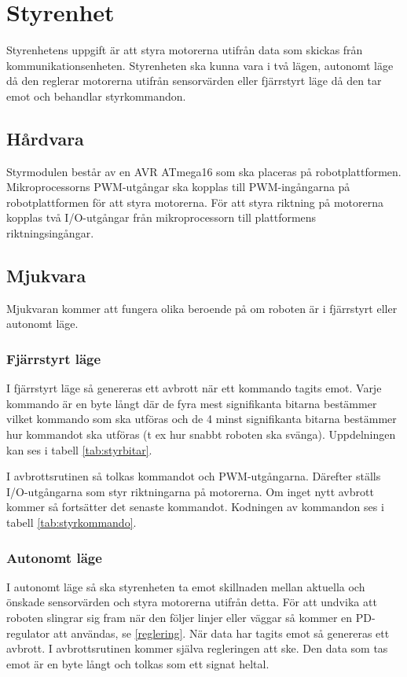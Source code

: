 \section{Styrenhet}
Styrenhetens uppgift är att styra motorerna utifrån data som skickas från kommunikationsenheten.
Styrenheten ska kunna vara i två lägen, autonomt läge då den reglerar motorerna utifrån sensorvärden eller 
fjärrstyrt läge då den tar emot och behandlar styrkommandon.
\subsection{Hårdvara}
Styrmodulen består av en AVR ATmega16 som ska placeras på robotplattformen.
Mikroprocessorns PWM-utgångar ska kopplas till PWM-ingångarna på robotplattformen för att styra motorerna.
För att styra riktning på motorerna kopplas två I/O-utgångar från mikroprocessorn till plattformens riktningsingångar.
\subsection{Mjukvara}
Mjukvaran kommer att fungera olika beroende på om roboten är i fjärrstyrt eller autonomt läge.
\subsubsection{Fjärrstyrt läge}
I fjärrstyrt läge så genereras ett avbrott när ett kommando tagits emot.
Varje kommando är en byte långt där de fyra mest signifikanta bitarna bestämmer vilket kommando som ska utföras
och de 4 minst signifikanta bitarna bestämmer hur kommandot ska utföras (t ex hur snabbt roboten ska svänga).
Uppdelningen kan ses i tabell \ref{tab:styrbitar}.

I avbrottsrutinen så tolkas kommandot och PWM-utgångarna. Därefter ställs I/O-utgångarna som styr riktningarna på motorerna. Om inget nytt avbrott kommer så fortsätter det senaste kommandot.
Kodningen av kommandon ses i tabell \ref{tab:styrkommando}.


\subsubsection{Autonomt läge}
I autonomt läge så ska styrenheten ta emot skillnaden mellan aktuella och önskade sensorvärden och styra motorerna utifrån detta.
För att undvika att roboten slingrar sig fram när den följer linjer eller 
väggar så kommer en PD-regulator att användas, se \ref{reglering}.
När data har tagits emot så genereras ett avbrott. 
I avbrottsrutinen kommer själva regleringen att ske. Den data som tas emot är en byte långt 
och tolkas som ett signat heltal. 

